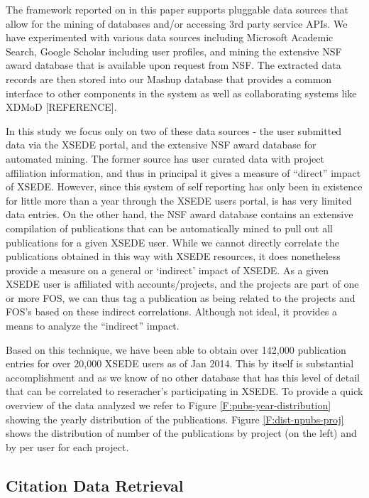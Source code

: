 \documentclass{sig-alternate}
\begin{document}
The framework reported on in this paper supports pluggable data sources that allow for the mining of databases and/or accessing 3rd party service APIs. We have experimented with various data sources including Microsoft Academic Search, Google Scholar including user profiles, and mining the extensive NSF award database that is available upon request from NSF. The extracted data records are then stored into our Mashup database that provides a common interface to other components in the system as well as collaborating systems like XDMoD [REFERENCE]. 
 
In this study we focus only on two of these data sources - the user submitted data via the XSEDE portal, and the extensive NSF award database for automated mining. The former source has user curated data with project affiliation information, and thus in principal it gives a measure of “direct” impact of XSEDE. However, since this system of self reporting has only been in existence for little more than a year through the XSEDE users portal, is has very limited data entries.  On the other hand, the NSF award database contains an extensive compilation of publications that can be automatically mined to pull out all publications for a given XSEDE user.   While we cannot directly correlate the publications obtained in this way with XSEDE resources, it does nonetheless provide a measure on a general or ‘indirect’ impact of XSEDE.   As a given XSEDE user is affiliated with accounts/projects, and the projects are part of one or more FOS, we can thus tag a publication as being related to the projects and FOS’s based on these indirect correlations. Although not ideal, it provides a means to analyze the “indirect” impact. 
 
Based on this technique, we have been able to obtain over 142,000 publication entries for over 20,000 XSEDE users as of Jan 2014.  This by itself is substantial accomplishment and as we know of no other database that has this level of detail that can be correlated to reseracher’s participating in XSEDE. To provide a quick overview of the data analyzed we refer to Figure \ref{F:pubs-year-distribution} showing the yearly distribution of the publications. Figure \ref{F:dist-npubs-proj} shows the distribution of number of the publications by project (on the left) and by per user for each project. 
 
\subsection{Citation Data Retrieval} 
 
\end{document}
